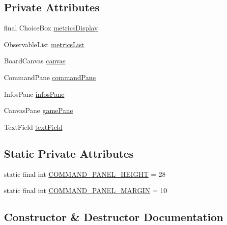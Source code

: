 \subsection*{Private Attributes}
\begin{DoxyCompactItemize}
\item 
final Choice\+Box \mbox{\hyperlink{classui_1_1_u_i_elements_1_1_main_layout_a0c8e7a229ce5d82f5b04bae758041b70}{metrics\+Display}}
\item 
Observable\+List \mbox{\hyperlink{classui_1_1_u_i_elements_1_1_main_layout_a5aee379cc3e7c44ae665664db9fd65c6}{metrics\+List}}
\item 
Board\+Canvas \mbox{\hyperlink{classui_1_1_u_i_elements_1_1_main_layout_a2836647c57935121f8ed81e6bc8d3b8d}{canvas}}
\item 
Command\+Pane \mbox{\hyperlink{classui_1_1_u_i_elements_1_1_main_layout_a0ec8b3a6b7930a07efcd9344ecc8695e}{command\+Pane}}
\item 
Infos\+Pane \mbox{\hyperlink{classui_1_1_u_i_elements_1_1_main_layout_a3a972fb1a28d41358a4874d49514ac83}{infos\+Pane}}
\item 
Canvas\+Pane \mbox{\hyperlink{classui_1_1_u_i_elements_1_1_main_layout_aa9dc53f5939b42b0c805291707b0c4c6}{game\+Pane}}
\item 
Text\+Field \mbox{\hyperlink{classui_1_1_u_i_elements_1_1_main_layout_a3323a9ec07f10c0971186a997ba9d459}{text\+Field}}
\end{DoxyCompactItemize}
\subsection*{Static Private Attributes}
\begin{DoxyCompactItemize}
\item 
static final int \mbox{\hyperlink{classui_1_1_u_i_elements_1_1_main_layout_a039d5983fd0f0be16d850c1eaa937027}{C\+O\+M\+M\+A\+N\+D\+\_\+\+P\+A\+N\+E\+L\+\_\+\+H\+E\+I\+G\+HT}} = 28
\item 
static final int \mbox{\hyperlink{classui_1_1_u_i_elements_1_1_main_layout_a50074635791c66af187e7feaab9f45da}{C\+O\+M\+M\+A\+N\+D\+\_\+\+P\+A\+N\+E\+L\+\_\+\+M\+A\+R\+G\+IN}} = 10
\end{DoxyCompactItemize}


\subsection{Constructor \& Destructor Documentation}
\mbox{\label{classui_1_1_u_i_elements_1_1_main_layout_aac19d26e23fe64414f1d40e154368a4e}} 

